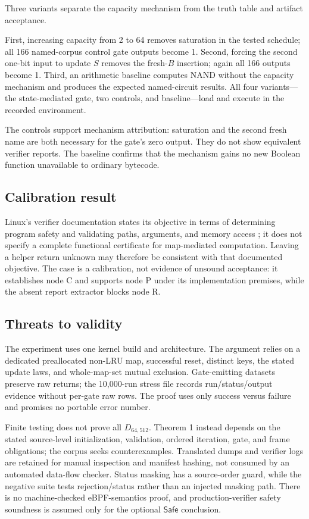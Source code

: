 \documentclass[conference]{IEEEtran}
\begin{document}
Three variants separate the capacity mechanism from the truth table and artifact acceptance.

First, increasing capacity from 2 to 64 removes saturation in the tested schedule; all 166 named-corpus control gate outputs become 1. Second, forcing the second one-bit input to update $S$ removes the fresh-$B$ insertion; again all 166 outputs become 1. Third, an arithmetic baseline computes NAND without the capacity mechanism and produces the expected named-circuit results. All four variants---the state-mediated gate, two controls, and baseline---load and execute in the recorded environment.

The controls support mechanism attribution: saturation and the second fresh name are both necessary for the gate's zero output. They do not show equivalent verifier reports. The baseline confirms that the mechanism gains no new Boolean function unavailable to ordinary bytecode.

\subsection{Calibration result}

Linux's verifier documentation states its objective in terms of determining program safety and validating paths, arguments, and memory access \cite{ref9}; it does not specify a complete functional certificate for map-mediated computation. Leaving a helper return unknown may therefore be consistent with that documented objective. The case is a calibration, not evidence of unsound acceptance: it establishes node C and supports node P under its implementation premises, while the absent report extractor blocks node R.

\subsection{Threats to validity}

The experiment uses one kernel build and architecture. The argument relies on a dedicated preallocated non-LRU map, successful reset, distinct keys, the stated update laws, and whole-map-set mutual exclusion. Gate-emitting datasets preserve raw returns; the 10,000-run stress file records run/status/output evidence without per-gate raw rows. The proof uses only success versus failure and promises no portable error number.

Finite testing does not prove all $D_{64,512}$. Theorem 1 instead depends on the stated source-level initialization, validation, ordered iteration, gate, and frame obligations; the corpus seeks counterexamples. Translated dumps and verifier logs are retained for manual inspection and manifest hashing, not consumed by an automated data-flow checker. Status masking has a source-order guard, while the negative suite tests rejection/status rather than an injected masking path. There is no machine-checked eBPF-semantics proof, and production-verifier safety soundness is assumed only for the optional $\mathsf{Safe}$ conclusion.
\end{document}
